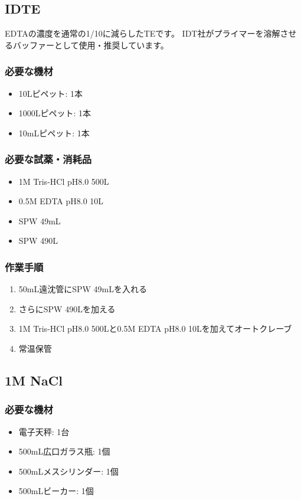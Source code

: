 \documentclass[titlepage,10pt,a4paper]{jsbook}
\begin{document}
\subsection{IDTE}

EDTAの濃度を通常の1/10に減らしたTEです。
IDT社がプライマーを溶解させるバッファーとして使用・推奨しています。

\subsubsection{必要な機材}
\begin{itemize}
\item 10{\textmu}Lピペット: 1本
\item 1000{\textmu}Lピペット: 1本
\item 10mLピペット: 1本
\end{itemize}

\subsubsection{必要な試薬・消耗品}
\begin{itemize}
\item 1M Tris-HCl pH8.0 500{\textmu}L
\item 0.5M EDTA pH8.0 10{\textmu}L
\item SPW 49mL
\item SPW 490{\textmu}L
\end{itemize}

\subsubsection{作業手順}
\begin{enumerate}
\item 50mL遠沈管にSPW 49mLを入れる
\item さらにSPW 490{\textmu}Lを加える
\item 1M Tris-HCl pH8.0 500{\textmu}Lと0.5M EDTA pH8.0 10{\textmu}Lを加えてオートクレーブ
\item 常温保管
\end{enumerate}

\subsection{1M NaCl}

\subsubsection{必要な機材}
\begin{itemize}
\item 電子天秤: 1台
\item 500mL広口ガラス瓶: 1個
\item 500mLメスシリンダー: 1個
\item 500mLビーカー: 1個
\end{itemize}
\end{document}
